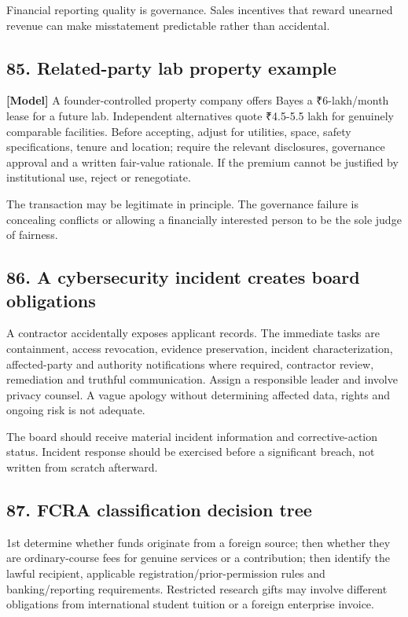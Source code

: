 Financial reporting quality is governance. Sales incentives that reward unearned revenue can make misstatement predictable rather than accidental.

\subsection{85. Related-party lab property example}

\textbf{[Model]} A founder-controlled property company offers Bayes a \textnormal{₹}6-lakh/month lease for a future lab. Independent alternatives quote \textnormal{₹}4.5-5.5 lakh for genuinely comparable facilities. Before accepting, adjust for utilities, space, safety specifications, tenure and location; require the relevant disclosures, governance approval and a written fair-value rationale. If the premium cannot be justified by institutional use, reject or renegotiate.

The transaction may be legitimate in principle. The governance failure is concealing conflicts or allowing a financially interested person to be the sole judge of fairness.

\subsection{86. A cybersecurity incident creates board obligations}

A contractor accidentally exposes applicant records. The immediate tasks are containment, access revocation, evidence preservation, incident characterization, affected-party and authority notifications where required, contractor review, remediation and truthful communication. Assign a responsible leader and involve privacy counsel. A vague apology without determining affected data, rights and ongoing risk is not adequate.

The board should receive material incident information and corrective-action status. Incident response should be exercised before a significant breach, not written from scratch afterward.

\subsection{87. FCRA classification decision tree}

1st determine whether funds originate from a foreign source; then whether they are ordinary-course fees for genuine services or a contribution; then identify the lawful recipient, applicable registration/prior-permission rules and banking/reporting requirements. Restricted research gifts may involve different obligations from international student tuition or a foreign enterprise invoice.

